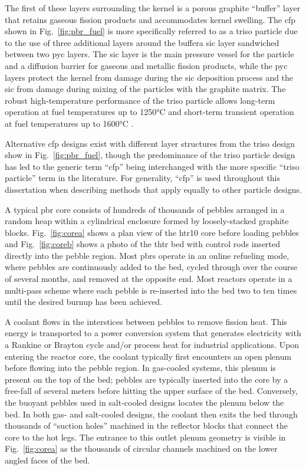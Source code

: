 The first of these layers surrounding the kernel is a porous graphite ``buffer'' layer that retains gaseous fission products and accommodates kernel swelling. The \gls{cfp} shown in Fig.\ \ref{fig:pbr_fuel} is more specifically referred to as a \gls{triso} particle due to the use of three additional layers around the buffer\mdash a \gls{sic} layer sandwiched between two \gls{pyc} layers. The \gls{sic} layer is the main pressure vessel for the particle and a diffusion barrier for gaseous and metallic fission products, while the \gls{pyc} layers protect the kernel from damage during the \gls{sic} deposition process and the \gls{sic} from damage during mixing of the particles with the graphite matrix. The robust high-temperature performance of the \gls{triso} particle allows long-term operation at fuel temperatures up to 1250\si{\celsius} and short-term transient operation at fuel temperatures up to 1600\si{\celsius} \cite{nabielek,demkowicz}.

Alternative \gls{cfp} designs exist with different layer structures from the \gls{triso} design show in Fig.\ \ref{fig:pbr_fuel}, though the predominance of the \gls{triso} particle design has led to the generic term ``\gls{cfp}'' being interchanged with the more specific ``\gls{triso} particle'' term in the literature. For generality, ``\gls{cfp}'' is used throughout this dissertation when describing methods that apply equally to other particle designs.

A typical \gls{pbr} core consists of hundreds of thousands of pebbles arranged in a random heap within a cylindrical enclosure formed by loosely-stacked graphite blocks. Fig.\ \ref{fig:corea} shows a plan view of the \gls{htr10} core before loading pebbles and Fig.\ \ref{fig:coreb} shows a photo of the \gls{thtr} bed with control rods inserted directly into the pebble region. Most \glspl{pbr} operate in an online refueling mode, where pebbles are continuously added to the bed, cycled through over the course of several months, and removed at the opposite end. Most reactors operate in a multi-pass scheme where each pebble is re-inserted into the bed two to ten times until the desired burnup has been achieved.

A coolant flows in the interstices between pebbles to remove fission heat. This energy is transported to a power conversion system that generates electricity with a Rankine or Brayton cycle and/or process heat for industrial applications. Upon entering the reactor core, the coolant typically first encounters an open plenum before flowing into the pebble region. In gas-cooled systems, this plenum is present on the top of the bed; pebbles are typically inserted into the core by a free-fall of several meters before hitting the upper surface of the bed. Conversely, the buoyant pebbles used in salt-cooled designs locates the plenum below the bed. In both gas- and salt-cooled designs, the coolant then exits the bed through thousands of ``suction holes'' machined in the reflector blocks that connect the core to the hot legs. The entrance to this outlet plenum geometry is visible in Fig.\ \ref{fig:corea} as the thousands of circular channels machined on the lower angled faces of the bed.

